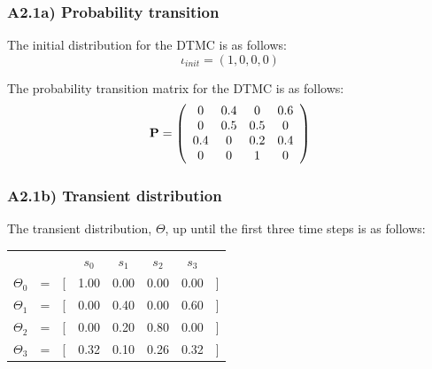 \documentclass[12pt]{report}
\begin{document}
\subsubsection*{A2.1a) Probability transition}
The initial distribution for the DTMC is as follows:
$$\iota_{init} = \left(1, 0, 0, 0\right)$$

The probability transition matrix for the DTMC is as follows:
$$\mathrm{\textbf{P}} = \left(
\begin{array}{c c c c}
	0 & 0.4 & 0 & 0.6\\
	0 & 0.5 & 0.5 & 0\\
	0.4 & 0 & 0.2 & 0.4\\
	0 & 0 & 1 & 0
\end{array}
\right)$$

\subsubsection*{A2.1b) Transient distribution}
The transient distribution, $\Theta$, up until the first three time steps is as follows:
\begin{center}
	\begin{tabular}{c c c c c c c c}
	& & & $s_0$ & $s_1$ & $s_2$ & $s_3$\\
	$\Theta_0$ & = & [ & 1.00 & 0.00 & 0.00 & 0.00 & ]\\
	$\Theta_1$ & = & [ & 0.00 & 0.40 & 0.00 & 0.60 & ]\\
	$\Theta_2$ & = & [ & 0.00 & 0.20 & 0.80 & 0.00 & ]\\
	$\Theta_3$ & = & [ & 0.32 & 0.10 & 0.26 & 0.32 & ]
	\end{tabular}
\end{center}
\end{document}
